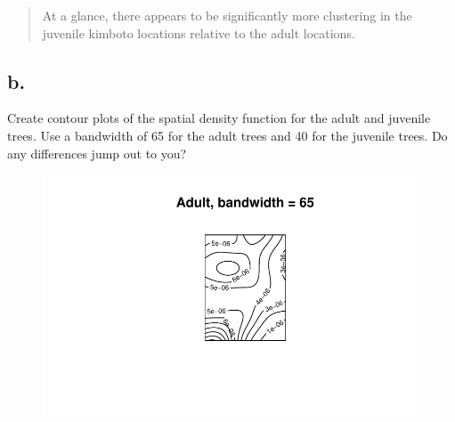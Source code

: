 \documentclass[
  letterpaper,
  DIV=11,
  numbers=noendperiod]{scrartcl}
\newenvironment{Shaded}{\begin{snugshade}}{\end{snugshade}}
\newcommand{\AttributeTok}[1]{\textcolor[rgb]{0.40,0.45,0.13}{#1}}
\newcommand{\CommentTok}[1]{\textcolor[rgb]{0.37,0.37,0.37}{#1}}
\newcommand{\DecValTok}[1]{\textcolor[rgb]{0.68,0.00,0.00}{#1}}
\newcommand{\FunctionTok}[1]{\textcolor[rgb]{0.28,0.35,0.67}{#1}}
\newcommand{\NormalTok}[1]{\textcolor[rgb]{0.00,0.23,0.31}{#1}}
\newcommand{\OtherTok}[1]{\textcolor[rgb]{0.00,0.23,0.31}{#1}}
\newcommand{\SpecialCharTok}[1]{\textcolor[rgb]{0.37,0.37,0.37}{#1}}
\newcommand{\StringTok}[1]{\textcolor[rgb]{0.13,0.47,0.30}{#1}}
\begin{document}
\begin{quote}
At a glance, there appears to be significantly more clustering in the
juvenile kimboto locations relative to the adult locations.
\end{quote}

\hypertarget{b.-1}{%
\subsection{b.}\label{b.-1}}

Create contour plots of the spatial density function for the adult and
juvenile trees. Use a bandwidth of 65 for the adult trees and 40 for the
juvenile trees. Do any differences jump out to you?

\begin{Shaded}
\end{Shaded}

\begin{figure}[H]

{\centering \includegraphics{cc-r-kd-hw_files/figure-pdf/unnamed-chunk-10-1.pdf}

}

\end{figure}
\end{document}
